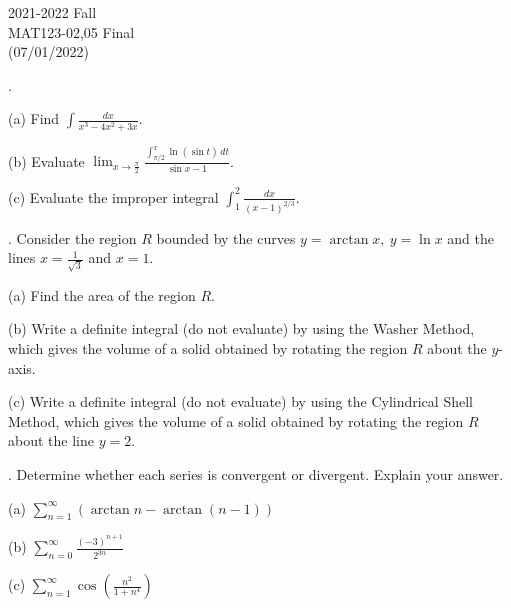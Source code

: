 \documentclass{article}
\begin{document}
\pagestyle{empty}
\large

\begin{center}
2021-2022 Fall \\MAT123-02,05 Final\\(07/01/2022)
\end{center}

.

\hfill

\noindent (a) Find $\displaystyle\int\frac{dx}{x^3-4x^2+3x}$.

\hfill

\noindent (b) Evaluate $\displaystyle\lim_{x\to\textstyle\frac\pi2}\frac{\displaystyle\int_{\pi/2}^x\ln(\sin t)\,dt}{\sin x-1}$.

\hfill

\noindent (c) Evaluate the improper integral  $\displaystyle\int_1^2\frac{dx}{(x-1)^{2/3}}$.

\hfill

. Consider the region $R$ bounded by the curves $y=\arctan x,\:y=\ln x$ and the lines $\displaystyle x=\frac1{\sqrt3}$ and $x=1$.

\hfill

\noindent (a) Find the area of the region $R$. 

\hfill

\noindent (b) Write a definite integral (do not evaluate) by using the Washer Method, which gives the volume of a solid obtained by rotating the region $R$ about the $y$-axis.

\hfill

\noindent (c) Write a definite integral (do not evaluate) by using the Cylindrical Shell Method, which gives the volume of a solid obtained by rotating the region $R$ about the line $y=2$.

\hfill

. Determine whether each series is convergent or divergent. Explain your answer.

\hfill

\noindent (a) $\displaystyle\sum_{n=1}^\infty\left(\arctan n-\arctan(n-1)\right)$

\hfill

\hfill

\noindent (b) $\displaystyle\sum_{n=0}^\infty\frac{(-3)^{n+1}}{2^{3n}}$

\hfill

\hfill

\noindent (c) $\displaystyle\sum_{n=1}^\infty\cos\left(\frac{n^2}{1+n^4}\right)$
\end{document}
